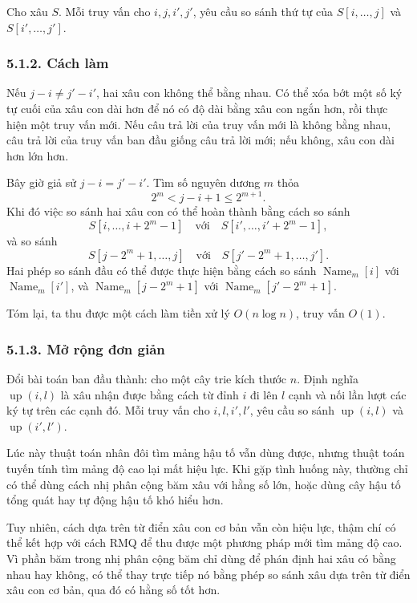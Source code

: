 \documentclass[11pt]{article}
\begin{document}
Cho xâu \(S\). Mỗi truy vấn cho \(i,j,i',j'\), yêu cầu so sánh thứ tự của
\(S[i,\ldots,j]\) và \(S[i',\ldots,j']\).

\subsubsection*{5.1.2. Cách làm}

Nếu \(j-i\ne j'-i'\), hai xâu con không thể bằng nhau. Có thể xóa bớt một số
ký tự cuối của xâu con dài hơn để nó có độ dài bằng xâu con ngắn hơn, rồi thực
hiện một truy vấn mới. Nếu câu trả lời của truy vấn mới là không bằng nhau,
câu trả lời của truy vấn ban đầu giống câu trả lời mới; nếu không, xâu con dài
hơn lớn hơn.

Bây giờ giả sử \(j-i=j'-i'\). Tìm số nguyên dương \(m\) thỏa
\[
  2^m<j-i+1\le 2^{m+1}.
\]
Khi đó việc so sánh hai xâu con có thể hoàn thành bằng cách so sánh
\[
  S[i,\ldots,i+2^m-1]\quad\text{với}\quad S[i',\ldots,i'+2^m-1],
\]
và so sánh
\[
  S[j-2^m+1,\ldots,j]\quad\text{với}\quad S[j'-2^m+1,\ldots,j'].
\]
Hai phép so sánh đầu có thể được thực hiện bằng cách so sánh
\(\operatorname{Name}_m[i]\) với \(\operatorname{Name}_m[i']\), và
\(\operatorname{Name}_m[j-2^m+1]\) với
\(\operatorname{Name}_m[j'-2^m+1]\).

Tóm lại, ta thu được một cách làm tiền xử lý \(O(n\log n)\), truy vấn \(O(1)\).

\subsubsection*{5.1.3. Mở rộng đơn giản}

Đổi bài toán ban đầu thành: cho một cây trie kích thước \(n\). Định nghĩa
\(\operatorname{up}(i,l)\) là xâu nhận được bằng cách từ đỉnh \(i\) đi lên
\(l\) cạnh và nối lần lượt các ký tự trên các cạnh đó. Mỗi truy vấn cho
\(i,l,i',l'\), yêu cầu so sánh \(\operatorname{up}(i,l)\) và
\(\operatorname{up}(i',l')\).

Lúc này thuật toán nhân đôi tìm mảng hậu tố vẫn dùng được, nhưng thuật toán
tuyến tính tìm mảng độ cao lại mất hiệu lực. Khi gặp tình huống này, thường
chỉ có thể dùng cách nhị phân cộng băm xâu với hằng số lớn, hoặc dùng cây hậu
tố tổng quát hay tự động hậu tố khó hiểu hơn.

Tuy nhiên, cách dựa trên từ điển xâu con cơ bản vẫn còn hiệu lực, thậm chí có
thể kết hợp với cách RMQ để thu được một phương pháp mới tìm mảng độ cao. Vì
phần băm trong nhị phân cộng băm chỉ dùng để phán định hai xâu có bằng nhau
hay không, có thể thay trực tiếp nó bằng phép so sánh xâu dựa trên từ điển xâu
con cơ bản, qua đó có hằng số tốt hơn.
\end{document}
